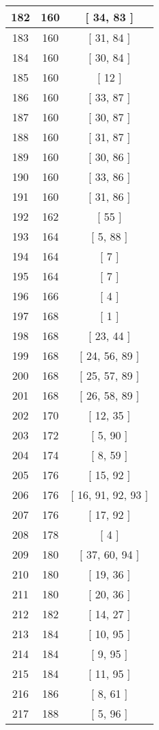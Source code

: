 \begin{center}
\begin{longtable}[H]{|| c c c ||}
\hline
182 & 160 & [ 34, 83 ] \\ 
\hline
183 & 160 & [ 31, 84 ] \\ 
\hline
184 & 160 & [ 30, 84 ] \\ 
\hline
185 & 160 & [ 12 ] \\ 
\hline
186 & 160 & [ 33, 87 ] \\ 
\hline
187 & 160 & [ 30, 87 ] \\ 
\hline
188 & 160 & [ 31, 87 ] \\ 
\hline
189 & 160 & [ 30, 86 ] \\ 
\hline
190 & 160 & [ 33, 86 ] \\ 
\hline
191 & 160 & [ 31, 86 ] \\ 
\hline
192 & 162 & [ 55 ] \\ 
\hline
193 & 164 & [ 5, 88 ] \\ 
\hline
194 & 164 & [ 7 ] \\ 
\hline
195 & 164 & [ 7 ] \\ 
\hline
196 & 166 & [ 4 ] \\ 
\hline
197 & 168 & [ 1 ] \\ 
\hline
198 & 168 & [ 23, 44 ] \\ 
\hline
199 & 168 & [ 24, 56, 89 ] \\ 
\hline
200 & 168 & [ 25, 57, 89 ] \\ 
\hline
201 & 168 & [ 26, 58, 89 ] \\ 
\hline
202 & 170 & [ 12, 35 ] \\ 
\hline
203 & 172 & [ 5, 90 ] \\ 
\hline
204 & 174 & [ 8, 59 ] \\ 
\hline
205 & 176 & [ 15, 92 ] \\ 
\hline
206 & 176 & [ 16, 91, 92, 93 ] \\ 
\hline
207 & 176 & [ 17, 92 ] \\ 
\hline
208 & 178 & [ 4 ] \\ 
\hline
209 & 180 & [ 37, 60, 94 ] \\ 
\hline
210 & 180 & [ 19, 36 ] \\ 
\hline
211 & 180 & [ 20, 36 ] \\ 
\hline
212 & 182 & [ 14, 27 ] \\ 
\hline
213 & 184 & [ 10, 95 ] \\ 
\hline
214 & 184 & [ 9, 95 ] \\ 
\hline
215 & 184 & [ 11, 95 ] \\ 
\hline
216 & 186 & [ 8, 61 ] \\ 
\hline
217 & 188 & [ 5, 96 ] \\ 

\end{longtable}
\end{center}
